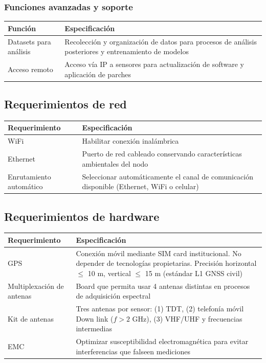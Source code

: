 \subsubsection{Funciones avanzadas y soporte}

\begin{tabularx}{\textwidth}{@{}l X@{}}
\toprule
Función & Especificación \\
\midrule
Datasets para análisis & Recolección y organización de datos para procesos de análisis posteriores y entrenamiento de modelos \\
Acceso remoto & Acceso vía IP a sensores para actualización de software y aplicación de parches \\
\bottomrule
\end{tabularx}

\subsection{Requerimientos de red}

\begin{tabularx}{\textwidth}{@{}l X@{}}
\toprule
Requerimiento & Especificación \\
\midrule
WiFi & Habilitar conexión inalámbrica \\
Ethernet & Puerto de red cableado conservando características ambientales del nodo \\
Enrutamiento automático & Seleccionar automáticamente el canal de comunicación disponible (Ethernet, WiFi o celular) \\
\bottomrule
\end{tabularx}

\subsection{Requerimientos de hardware}

\begin{tabularx}{\textwidth}{@{}l X@{}}
\toprule
Requerimiento & Especificación \\
\midrule
GPS & Conexión móvil mediante SIM card institucional. No depender de tecnologías propietarias. Precisión horizontal $\leq$ 10 m, vertical $\leq$ 15 m (estándar L1 GNSS civil) \\
Multiplexación de antenas & Board que permita usar 4 antenas distintas en procesos de adquisición espectral \\
Kit de antenas & Tres antenas por sensor: (1) TDT, (2) telefonía móvil Down link ($f > 2$ GHz), (3) VHF/UHF y frecuencias intermedias \\
EMC & Optimizar susceptibilidad electromagnética para evitar interferencias que falseen mediciones \\
\bottomrule
\end{tabularx}

